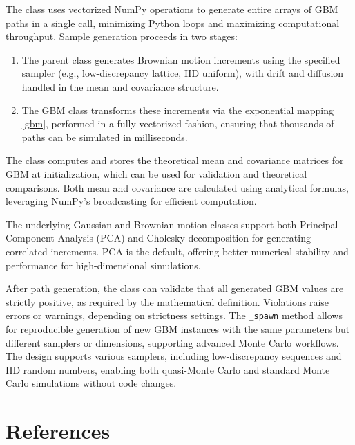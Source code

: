 \documentclass{article}
\begin{document}
The class uses vectorized NumPy operations to generate entire arrays of GBM paths in a single call, minimizing Python loops and maximizing computational throughput. Sample generation proceeds in two stages:
\begin{enumerate}
\item 
The parent class generates Brownian motion increments using the specified sampler (e.g., low-discrepancy lattice, IID uniform), with drift and diffusion handled in the mean and covariance structure.
\item  The GBM class transforms these increments via the exponential mapping    \eqref{gbm}, performed in a fully vectorized fashion, ensuring that thousands of paths can be simulated in milliseconds.
\end{enumerate}
The class computes and stores the theoretical mean and covariance matrices for GBM at initialization, which can be used for validation and theoretical comparisons. Both mean and covariance are calculated using analytical formulas, leveraging NumPy’s broadcasting for efficient computation.


The underlying Gaussian and Brownian motion classes support both Principal Component Analysis (PCA) and Cholesky decomposition for generating correlated increments. PCA is the default, offering better numerical stability and performance for high-dimensional simulations.

After path generation, the class can validate that all generated GBM values are strictly positive, as required by the mathematical definition. Violations raise errors or warnings, depending on strictness settings.
The \texttt{\_spawn} method allows for reproducible generation of new GBM instances with the same parameters but different samplers or dimensions, supporting advanced Monte Carlo workflows.  The design supports various samplers, including low-discrepancy sequences and IID random numbers, enabling both quasi-Monte Carlo and standard Monte Carlo simulations without code changes.
\section*{References}
\end{document}
